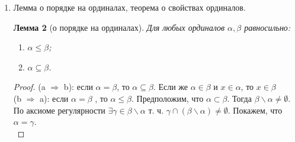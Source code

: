\documentclass[a4paper]{article}
\newtheorem*{lemma*}{Лемма}
\theoremstyle{definition}
\newtheorem*{definition*}{Определение}
\begin{document}
\begin{enumerate}
\begin{definition*}[Ординал]
        Ординалом называется транзитивное множество все элементы которого сравнимы относительно включения.
       \end{definition*}
       \begin{definition*}[Транзитивное множество]
        Множество $\alpha$ называется транзитивным, если из $x \in \alpha $ и $y \in x $ следует, что  $y \in \alpha $.
       \end{definition*}
       \begin{lemma*}[Лемма об элементах ординала]
        Если $\alpha$ - ординал и $\beta \in \alpha$, то $\beta$ - ординал.
       \end{lemma*}
       \begin{proof}
        Пусть $x,y\in \beta$. Тогда $x,y\in \alpha$. Следовательно, $x$ и $y$ равны или сравнимы относительно $\in$. Докажем, что $\beta$ транзитивно. Пусть $y \in x \in \beta$. Тогда $x \in \alpha$ и $y \in \alpha$. Возможны три случая:
        \begin{enumerate}
         \item $\beta \in y$ Тогда получаем, что $\beta \in y \in x \in \beta$ - противоречие.
         \item $\beta = y$ Получаем, что $\beta \in x \in \beta$ - противоречие.
         \item $y \in \beta$.
               Следовательно, $\beta$ - ординал.
        \end{enumerate}
       \end{proof}
 \item Лемма о порядке на ординалах, теорема о свойствах ординалов.
       \begin{lemma*}[о порядке на ординалах]
        Для любых ординалов $\alpha, \beta$ равносильно:
        \begin{enumerate}
         \item $\alpha \leq \beta$;
         \item $\alpha \subseteq \beta$.
        \end{enumerate}
       \end{lemma*}
       \begin{proof}
        (a $\Rightarrow$ b): если $\alpha = \beta$, то $\alpha \subseteq \beta$. Если же $\alpha \in \beta$ и $x \in \alpha$, то $x \in\beta$\\
        (b $\Rightarrow$ a): если $\alpha = \beta$ , то $\alpha \leq \beta$. Предположим, что $\alpha \subset \beta$. Тогда $\beta \backslash \alpha \neq \emptyset$. По аксиоме регулярности $\exists \gamma \in \beta \backslash \alpha$ т. ч. $\gamma \cap (\beta \backslash \alpha) \neq \emptyset$. Покажем, что $\alpha = \gamma$. \\

\end{proof}
\end{enumerate}
\end{document}
